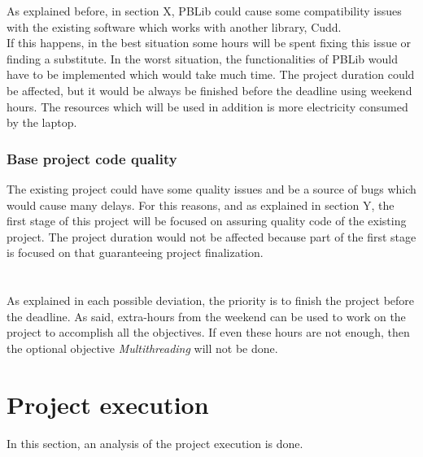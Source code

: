 As explained before, in section X, PBLib could cause some compatibility issues with the existing software which works with another library, Cudd. \\
If this happens, in the best situation some hours will be spent fixing this issue or finding a substitute. In the worst situation, the functionalities of PBLib would have to be implemented which would take much time. The project duration could be affected, but it would be always be finished before the deadline using weekend hours. The resources which will be used in addition is more electricity consumed by the laptop.

\subsubsection{Base project code quality}
The existing project could have some quality issues and be a source of bugs which would cause many delays. For this reasons, and as explained in section Y, the first stage of this project will be focused on assuring quality code of the existing project.  The project duration would not be affected because part of the first stage is focused on that guaranteeing project finalization.\\\\\\
As explained in each possible deviation, the priority is to finish the project before the deadline.  As said, extra-hours from the weekend can be used to work on the project to accomplish all the objectives. If even these hours are not enough, then the optional objective \emph{Multithreading} will not be done. 

\section{Project execution}%

In this section, an analysis of the project execution is done.

